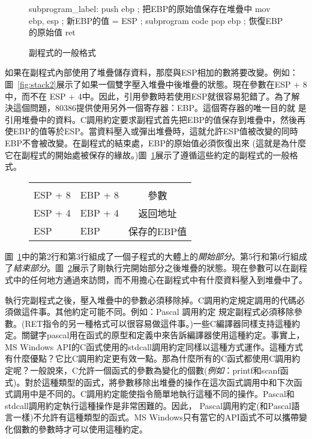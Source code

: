 \begin{figure}[t]
\begin{AsmCodeListing}[frame=single]
subprogram_label:
      push   ebp           ; 把EBP的原始值保存在堆疊中
      mov    ebp, esp      ; 新EBP的值 = ESP
; subprogram code
      pop    ebp           ; 恢復EBP的原始值
      ret
\end{AsmCodeListing}
\caption{副程式的一般格式 \label{fig:subskel1}}
\end{figure}

如果在副程式內部使用了堆疊儲存資料，那麼與ESP相加的數將要改變。例如：
圖~\ref{fig:stack2}展示了如果一個雙字壓入堆疊中後堆疊的狀態。現在參數在{\code ESP + 8}中，而不在{\code
ESP + 4}中。因此，引用參數時若使用ESP就很容易犯錯了。為了解決這個問題，80386提供使用另外一個寄存器：EBP。這個寄存器的唯一目的就 是引用堆疊中的資料。C調用約定要求副程式首先把EBP的值保存到堆疊中，然後再使EBP的值等於ESP。當資料壓入或彈出堆疊時，這就允許ESP值被改變的同時EBP不會被改變。在副程式的結束處，EBP的原始值必須恢復出來
(這就是為什麼它在副程式的開始處被保存的緣故。)圖~\ref{fig:subskel1}展示了遵循這些約定的副程式的一般格式。

\begin{figure}[t]
\centering
\begin{tabular}{ll|c|}
\cline{3-3} &  & \\ \cline{3-3}
ESP + 8 & EBP + 8 & 參數 \\ \cline{3-3}
ESP + 4 & EBP + 4 & 返回地址 \\ \cline{3-3}
ESP     & EBP     & 保存的EBP值 \\ \cline{3-3}
\end{tabular}
\caption{}
\label{fig:stack3}
\end{figure}


圖~\ref{fig:subskel1}中的第2行和第3行組成了一個子程式的大體上的\emph{開始部分}。第5行和第6行組成了\emph{結束部分}。圖~\ref{fig:stack3}展示了剛執行完開始部分之後堆疊的狀態。現在參數可以在副程式中的任何地方通過{\code [EBP + 8]}來訪問，而不用擔心在副程式中有什麼資料壓入到堆疊中了。

執行完副程式之後，壓入堆疊中的參數必須移除掉。C調用約定規定調用的代碼必須做這件事。其他約定可能不同。例如：Pascal 調用約定
規定副程式必須移除參數。(RET指令的另一種格式可以很容易做這件事。)一些C編譯器同樣支持這種約定。關鍵字{\code pascal}用在函式的原型和定義中來告訴編譯器使用這種約定。事實上，MS Windows API的C函式使用的{\code stdcall}調用約定同樣以這種方式運作。這種方式有什麼優點？它比C調用約定更有效一點。那為什麼所有的C函式都使用C調用約定呢？一般說來，C允許一個函式的參數為變化的個數(\emph{例如}：{\code printf}和{\code scanf}函式)。對於這種類型的函式，將參數移除出堆疊的操作在這次函式調用中和下次函式調用中是不同的。C調用約定能使指令簡單地執行這種不同的操作。Pascal和stdcall調用約定執行這種操作是非常困難的。因此，
Pascal調用約定(和Pascal語言一樣)不允許有這種類型的函式。MS Windows只有當它的API函式不可以攜帶變化個數的參數時才可以使用這種約定。


